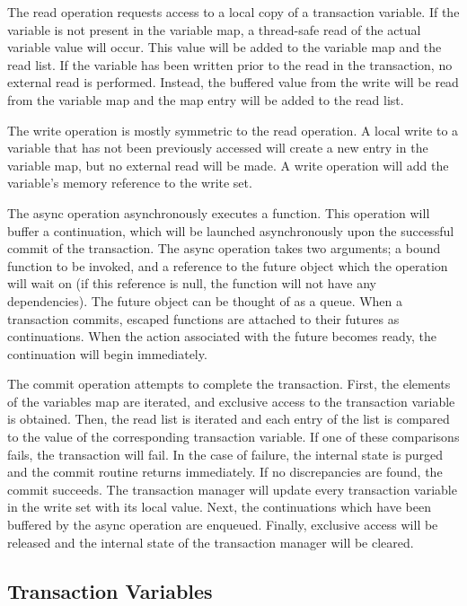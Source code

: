 \documentclass[conference]{IEEEtran}
\begin{document}
The read operation requests access to a local copy of a transaction
variable. If the variable is not present in the variable map, a
thread-safe read of the actual variable value will occur. This value will be
added to the variable map and the read list. If the variable has been written
prior to the read in the transaction, no external read is performed. Instead,
the buffered value from the write will be read from the variable map
and the map entry will be added to the read list.

The write operation is mostly symmetric to the read operation. A local write to
a variable that has not been previously accessed will create a new entry in the
variable map, but no external read will be made. A write operation will add the
variable's memory reference to the write set.

The async operation asynchronously executes a function. This operation will
buffer a continuation, which will be launched asynchronously upon the
successful commit of the transaction. The async operation takes two
arguments; a bound function to be invoked, and a reference to the future
object which the operation will wait on (if this reference is null, the function will not have any dependencies). The future object can be
thought of as a queue. When a transaction commits, escaped functions are
attached to their futures as continuations. When the action associated with the
future becomes ready, the continuation will begin immediately.

The commit operation attempts to complete the transaction. First, the elements of the variables map are iterated, and exclusive access to the transaction variable is obtained. Then, the read list is iterated and each entry of the list is compared to the value of the corresponding transaction variable. If one of these comparisons fails, the transaction will fail. In the case of failure, the internal state is purged and the commit routine returns immediately. If no discrepancies are found, the commit succeeds. The transaction manager will update every transaction variable in the write set with its local value. Next, the continuations which have been buffered by the async operation are enqueued. Finally, exclusive access will be released and the internal state of the transaction manager will be cleared.

\subsection{Transaction Variables}
\end{document}
